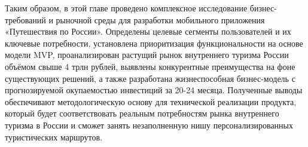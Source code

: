 \noindent Таким образом, в этой главе проведено комплексное исследование бизнес-требований и рыночной среды для разработки мобильного приложения «Путешествия по России». Определены целевые сегменты пользователей и их ключевые потребности, установлена приоритизация функциональности на основе модели MVP, проанализирован растущий рынок внутреннего туризма России объёмом свыше 4 трлн рублей, выявлены конкурентные преимущества на фоне существующих решений, а также разработана жизнеспособная бизнес-модель с прогнозируемой окупаемостью инвестиций за 20-24 месяца. Полученные выводы обеспечивают методологическую основу для технической реализации продукта, который будет соответствовать реальным потребностям рынка внутреннего туризма в России и сможет занять незаполненную нишу персонализированных туристических маршрутов.




